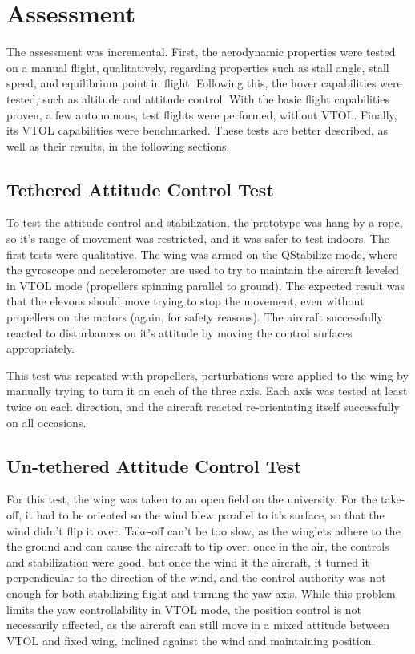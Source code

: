 \chapter{Assessment} \label{chap:assessment}

The assessment was incremental. First, the aerodynamic properties were tested on a manual flight, qualitatively, regarding properties such as stall angle, stall speed, and equilibrium point in flight. Following this, the hover capabilities were tested, such as altitude and attitude control. With the basic flight capabilities proven, a few autonomous, test flights were performed, without VTOL. Finally, its VTOL capabilities were benchmarked. These tests are better described, as well as their results, in the following sections.


\section{Tethered Attitude Control Test}

To test the attitude control and stabilization, the prototype was hang by a rope, so it's range of movement was restricted, and it was safer to test indoors.
%
The first tests were qualitative. The wing was armed on the QStabilize mode, where the gyroscope and accelerometer are used to try to maintain the aircraft leveled in VTOL mode (propellers spinning parallel to ground).
%
The expected result was that the elevons should move trying to stop the movement, even without propellers on the motors (again, for safety reasons).
%
The aircraft successfully reacted to disturbances on it's attitude by moving the control surfaces appropriately.
% 

This test was repeated with propellers, perturbations were applied to the wing by manually trying to turn it on each of the three axis. 
%
Each axis was tested at least twice on each direction, and the aircraft reacted re-orientating itself successfully on all occasions.

\section{Un-tethered Attitude Control Test} 

For this test, the wing was taken to an open field on the university.
%
For the take-off, it had to be oriented so the wind blew parallel to it's surface, so that the wind didn't flip it over.
%
Take-off can't be too slow, as the winglets adhere to the the ground and can cause the aircraft to tip over.
%
once in the air, the controls and stabilization were good, but once the wind it the aircraft, it turned it perpendicular to the direction of the wind, and the control authority was not enough for both stabilizing flight and turning the yaw axis.
%
While this problem limits the yaw controllability in VTOL mode, the position control is not necessarily affected, as the aircraft can still move in a mixed attitude between VTOL and fixed wing, inclined against the wind and maintaining position.
%

